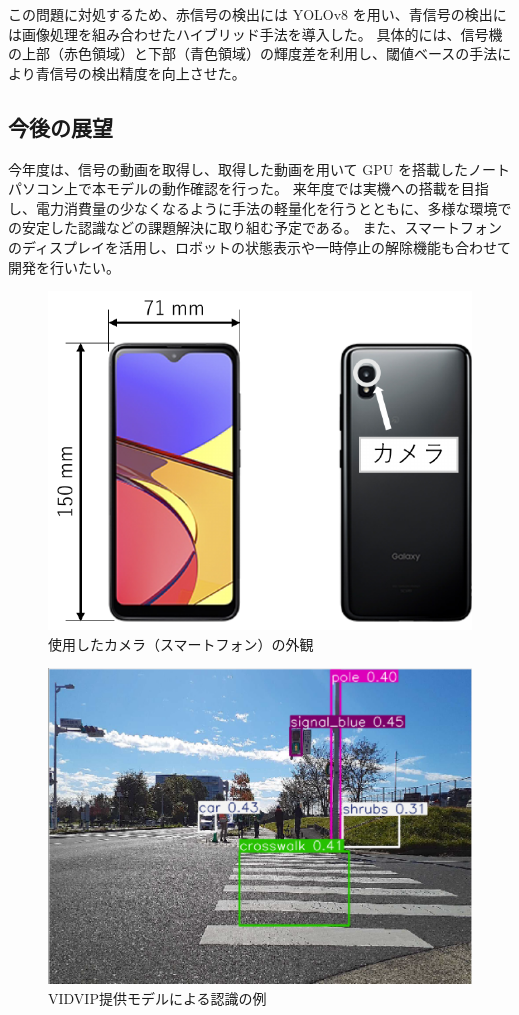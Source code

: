 \documentclass[twocolumn,9pt]{jsproceedings}
\begin{document}
この問題に対処するため、赤信号の検出には YOLOv8 を用い、青信号の検出には画像処理を組み合わせたハイブリッド手法を導入した。
具体的には、信号機の上部（赤色領域）と下部（青色領域）の輝度差を利用し、閾値ベースの手法により青信号の検出精度を向上させた。

\subsection{今後の展望}
今年度は、信号の動画を取得し、取得した動画を用いて GPU を搭載したノートパソコン上で本モデルの動作確認を行った。
来年度では実機への搭載を目指し、電力消費量の少なくなるように手法の軽量化を行うとともに、多様な環境での安定した認識などの課題解決に取り組む予定である。
また、スマートフォンのディスプレイを活用し、ロボットの状態表示や一時停止の解除機能も合わせて開発を行いたい。

\begin{figure}[h]
  \begin{center}
    \includegraphics[width=0.6\linewidth]{figs/smartphone.pdf}
    \caption{使用したカメラ（スマートフォン）の外観}
    \label{fig:smartphone}
  \end{center}
\end{figure}

\begin{figure}[h]
  \begin{center}
    \includegraphics[width=1.0\linewidth]{figs/result_of_yolo.pdf}
    \caption{VIDVIP提供モデルによる認識の例}
    \label{fig:result_yolo}
  \end{center}
\end{figure}
\end{document}
